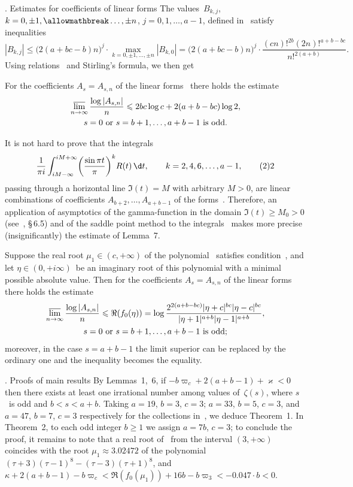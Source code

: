 \subhead{}. Estimates for coefficients of linear forms
\endsubhead
The values~$B_{k,j}$, $k=0,\pm1,\allowmathbreak\dots,\pm n$,
$j=0,1,\dots,a-1$, defined in~
satisfy inequalities
$$
|B_{k,j}|
\le\bigl(2(a+bc-b)n\bigr)^j\cdot\max_{k=0,\pm1,\dots,\pm n}|B_{k,0}|
=\bigl(2(a+bc-b)n\bigr)^j\cdot\frac{(cn)!^{2b}(2n)!^{a+b-bc}}{n!^{2(a+b)}}.
$$
Using relations~ and Stirling's formula,
we then get

For the coefficients $A_s=A_{s,n}$ of the linear forms~
there holds the estimate
$$
\gathered
\varlimsup_{n\to\infty}\frac{\log|A_{s,n}|}n
\le2bc\log c+2(a+b-bc)\log2,
\\
\text{$s=0$ or $s=b+1,\dots,a+b-1$ is odd}.
\endgathered
$$
\endproclaim

It is not hard to prove that the integrals
$$
\frac1{\pi i}\int_{iM-\infty}^{iM+\infty}
\biggl(\frac{\sin\pi t}\pi\biggr)^kR(t)\,\d t,
\qquad k=2,4,6,\dots,a-1,
\tag22
$$
passing through a horizontal line $\Im(t)=M$ with arbitrary $M>0$,
are linear combinations of coefficients $A_{b+2},\dots,A_{a+b-1}$
of the forms~. Therefore, an application of
asymptotics of the gamma-function in the domain
$\Im(t)\ge M_0>0$ (see~\cite{B}, \S\,6.5)
and of the saddle point method to the integrals~
makes more precise (insignificantly) the estimate of Lemma~7.

Suppose the real root $\mu_1\in(c,+\infty)$
of the polynomial~ satisfies condition~\rom,
and let $\eta\in(0,+i\infty)$~be
an imaginary root of this polynomial
with a minimal possible absolute value.
Then for the coefficients $A_s=A_{s,n}$ of
the linear forms~ there holds the estimate
$$
\gathered
\varlimsup_{n\to\infty}\frac{\log|A_{s,n}|}n
\le\Re(f_0(\eta))
=\log\frac{2^{2(a+b-bc)}|\eta+c|^{bc}|\eta-c|^{bc}}
{|\eta+1|^{a+b}|\eta-1|^{a+b}},
\\
\text{$s=0$ or $s=b+1,\dots,a+b-1$ is odd\/};
\endgathered
$$
moreover\rom, in the case $s=a+b-1$
the limit superior can be replaced by the ordinary one
and the inequality becomes the equality.
\endproclaim

\subhead{}. Proofs of main results
\endsubhead
By Lemmas~1,~6, if $-b\varpi_c+2(a+b-1)+\varkappa<0$
then there exists at least one irrational number
among values of~$\zeta(s)$, where $s$~is odd and $b<s<a+b$.
Taking $a=19$, $b=3$, $c=3$;
$a=33$, $b=5$, $c=3$, and $a=47$, $b=7$, $c=3$
respectively for the collections in~,
we deduce Theorem~1.
In Theorem~2, to each odd integer $b\ge1$ we assign $a=7b$, $c=3$;
to conclude the proof, it remains to note that
a real root of~
from the interval $(3,+\infty)$ coincides with the root
$\mu_1\approx3.02472$ of the polynomial
$(\tau+3)(\tau-1)^8-(\tau-3)(\tau+1)^8$,
and
$\kappa+2(a+b-1)-b\varpi_c
<\Re(f_0(\mu_1))+16b-b\varpi_3
<-0.047\cdot b<0$.

